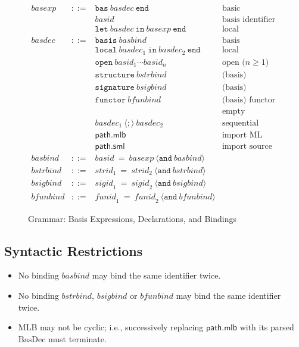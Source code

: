 \documentclass[draft]{article}
\renewcommand{\mit}[1]{\mathit{#1}}
\newcommand{\mrm}[1]{\mathrm{#1}}
\newcommand{\mtt}[1]{\mathtt{#1}}
\newcommand{\msf}[1]{\mathsf{#1}}
\begin{document}
\begin{figure}[h]
\begin{displaymath}
\begin{array}{rcll}
\mit{basexp} & ::= & 
\mtt{bas}~ \mit{basdec} ~\mtt{end} 
& \mbox{basic} \\&& 
\mit{basid} 
& \mbox{basis identifier} \\&&
\mtt{let}~ \mit{basdec} ~\mtt{in}~ \mit{basexp} ~\mtt{end} 
& \mbox{local declaration} \\

\mit{basdec} & ::= & 
\mtt{basis}~ \mit{basbind}
& \mbox{basis} \\&&
\mtt{local}~ \mit{basdec}_1 ~\mtt{in}~ \mit{basdec}_2 ~\mtt{end} 
& \mbox{local} \\&&
\mtt{open}~ \mit{basid}_1 \cdots \mit{basid}_n 
& \mbox{open ($n \geq 1$)} \\&&
\mtt{structure}~ \mit{bstrbind}
& \mbox{(basis) structure binding} \\&&
\mtt{signature}~ \mit{bsigbind}
& \mbox{(basis) signature binding} \\&&
\mtt{functor}~ \mit{bfunbind}
& \mbox{(basis) functor binding} \\&&
\quad
& \mbox{empty} \\&&
\mit{basdec}_1~\langle\mtt{;}\rangle~\mit{basdec}_2 
& \mbox{sequential} \\&&
\msf{path.mlb} &
\mbox{import ML basis} \\&&
\msf{path.sml} 
& \mbox{import source} \\

\mit{basbind} & ::= &  
\mit{basid} ~\mtt{=}~ \mit{basexp} ~\langle\mtt{and}~ \mit{basbind}\rangle \\
\mit{bstrbind} & ::= &  
\mit{strid}_1 ~\mtt{=}~ \mit{strid}_2 ~\langle\mtt{and}~ \mit{bstrbind}\rangle \\
\mit{bsigbind} & ::= &  
\mit{sigid}_1 ~\mtt{=}~ \mit{sigid}_2 ~\langle\mtt{and}~ \mit{bsigbind}\rangle \\
\mit{bfunbind} & ::= &  
\mit{funid}_1 ~\mtt{=}~ \mit{funid}_2 ~\langle\mtt{and}~ \mit{bfunbind}\rangle
\end{array}
\end{displaymath}
\caption{Grammar: Basis Expressions, Declarations, and Bindings}\label{fig:mlb:S:GrammaticalRules}
\end{figure}
%
\subsection{Syntactic Restrictions}
\begin{itemize}
\item No binding $\mit{basbind}$ may bind the same identifier twice.
\item No binding $\mit{bstrbind}$, $\mit{bsigbind}$ or $\mit{bfunbind}$ may bind the same identifier twice.
\item MLB may not be cyclic; i.e., successively replacing
  $\msf{path.mlb}$ with its parsed $\mrm{BasDec}$ must terminate.
\end{itemize}
%
\end{document}
